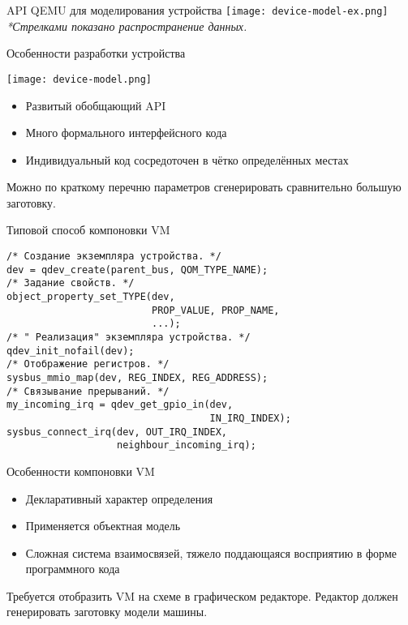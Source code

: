 \documentclass[unicode,hyperref={unicode=true}]{beamer}
\theoremstyle{definition}
\theoremstyle{plain}
\begin{document}
\begin{frame}{API QEMU для моделирования устройства}
\texttt{[image: device-model-ex.png]}
\vfill
\it{*Стрелками показано распространение данных.}
\end{frame}



\begin{frame}{Особенности разработки устройства}

\begin{minipage}{0.6\textwidth}
\texttt{[image: device-model.png]}
\end{minipage}
\begin{minipage}{0.38\textwidth}
\begin{itemize}
\item Развитый обобщающий API
\item Много формального интерфейсного кода
\item Индивидуальный код сосредоточен в чётко определённых местах
\end{itemize}
\end{minipage}

\begin{center}
Можно по краткому перечню параметров сгенерировать сравнительно большую
заготовку.
\end{center}

\end{frame}


\begin{frame}[fragile]{Типовой способ компоновки VM}
\lstset{language=C}
\begin{lstlisting}
/* Создание экземпляра устройства. */
dev = qdev_create(parent_bus, QOM_TYPE_NAME);
/* Задание свойств. */
object_property_set_TYPE(dev,
                         PROP_VALUE, PROP_NAME,
                         ...);
/* " Реализация" экземпляра устройства. */
qdev_init_nofail(dev);
/* Отображение регистров. */
sysbus_mmio_map(dev, REG_INDEX, REG_ADDRESS);
/* Связывание прерываний. */
my_incoming_irq = qdev_get_gpio_in(dev,
                                   IN_IRQ_INDEX);
sysbus_connect_irq(dev, OUT_IRQ_INDEX,
                   neighbour_incoming_irq);
\end{lstlisting}
\end{frame}


\begin{frame}{Особенности компоновки VM}

\begin{itemize}
\item Декларативный характер определения
\item Применяется объектная модель
\item Сложная система взаимосвязей, тяжело поддающаяся восприятию в форме
программного кода
\end{itemize}

\begin{center}
Требуется отобразить VM на схеме в графическом редакторе.
Редактор должен генерировать заготовку модели машины.
\end{center}

\end{frame}
\end{document}
